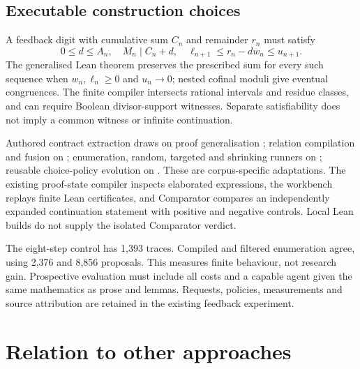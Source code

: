 \documentclass[10pt]{article}
\begin{document}
\subsection{Executable construction choices}
\label{sec:admissible-constructions}

A feedback digit with cumulative sum $C_n$ and remainder $r_n$ must satisfy
\[
0\le d\le A_n,\quad M_n\mid C_n+d,\quad
\ell_{n+1}\le r_n-dw_n\le u_{n+1}.
\]
The generalised Lean theorem preserves the prescribed sum for every such
sequence when $w_n,\ell_n\ge0$ and $u_n\to0$; nested cofinal moduli give
eventual congruences. The finite compiler intersects rational intervals and
residue classes, and can require Boolean divisor-support witnesses.
Separate satisfiability does not imply a common witness or infinite continuation.

Authored contract extraction draws on proof generalisation
\cite{proofgeneralisation}; relation compilation and fusion on
\cite{computingcorrectly,palamedes,mergingrelations}; enumeration, random,
targeted and shrinking runners on \cite{programmablepbt}; reusable choice-policy
evolution on \cite{alphaevolve,dreamprover}. These are corpus-specific adaptations.
The existing proof-state compiler inspects elaborated expressions, the workbench
replays finite Lean certificates, and Comparator compares an independently
expanded continuation statement with positive and negative controls.
Local Lean builds do not supply the isolated Comparator verdict.

The eight-step control has 1,393 traces. Compiled and filtered enumeration agree,
using 2,376 and 8,856 proposals. This measures finite behaviour, not research gain.
Prospective evaluation must include all costs and a capable agent given the
same mathematics as prose and lemmas. Requests, policies, measurements and
source attribution are retained in the existing feedback experiment.

\section{Relation to other approaches}\label{sec:related}
\small
\end{document}
